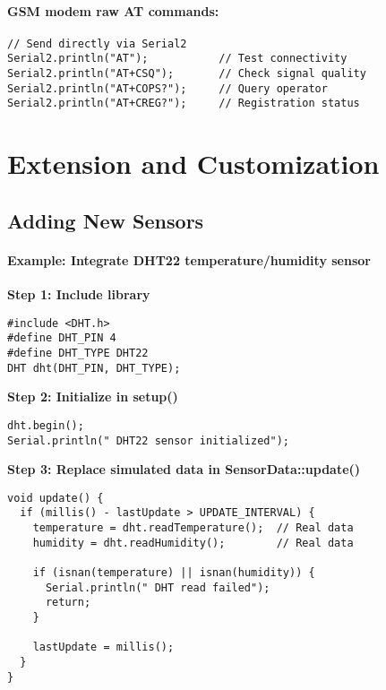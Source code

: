 \documentclass[11pt,a4paper]{article}
\begin{document}
\paragraph{GSM modem raw AT commands:}
\begin{verbatim}
// Send directly via Serial2
Serial2.println("AT");           // Test connectivity
Serial2.println("AT+CSQ");       // Check signal quality
Serial2.println("AT+COPS?");     // Query operator
Serial2.println("AT+CREG?");     // Registration status
\end{verbatim}

\section{Extension and Customization}

\subsection{Adding New Sensors}

\paragraph{Example: Integrate DHT22 temperature/humidity sensor}

\textbf{Step 1: Include library}
\begin{verbatim}
#include <DHT.h>
#define DHT_PIN 4
#define DHT_TYPE DHT22
DHT dht(DHT_PIN, DHT_TYPE);
\end{verbatim}

\textbf{Step 2: Initialize in setup()}
\begin{verbatim}
dht.begin();
Serial.println(" DHT22 sensor initialized");
\end{verbatim}

\textbf{Step 3: Replace simulated data in SensorData::update()}
\begin{verbatim}
void update() {
  if (millis() - lastUpdate > UPDATE_INTERVAL) {
    temperature = dht.readTemperature();  // Real data
    humidity = dht.readHumidity();        // Real data
    
    if (isnan(temperature) || isnan(humidity)) {
      Serial.println(" DHT read failed");
      return;
    }
    
    lastUpdate = millis();
  }
}
\end{verbatim}
\end{document}
